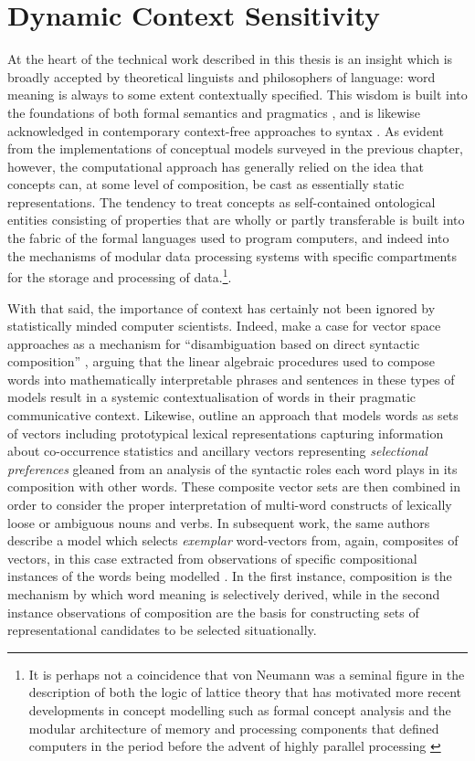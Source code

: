 \section{Dynamic Context Sensitivity} \label{sec:sensitivity}
At the heart of the technical work described in this thesis is an insight which is broadly accepted by theoretical linguists and philosophers of language: word meaning is always to some extent contextually specified.  This wisdom is built into the foundations of both formal semantics \citep{Montague1974} and pragmatics \citep{Grice1975}, and is likewise acknowledged in contemporary context-free approaches to syntax \citep{Chomsky1986}.  As evident from the implementations of conceptual models surveyed in the previous chapter, however, the computational approach has generally relied on the idea that concepts can, at some level of composition, be cast as essentially static representations.  The tendency to treat concepts as self-contained ontological entities consisting of properties that are wholly or partly transferable is built into the fabric of the formal languages used to program computers, and indeed into the mechanisms of modular data processing systems with specific compartments for the storage and processing of data.\footnote{It is perhaps not a coincidence that von Neumann was a seminal figure in the description of both the logic of lattice theory \citep{Birkhoff1958} that has motivated more recent developments in concept modelling such as formal concept analysis \citep{Wille1982} and the modular architecture of memory and processing components that defined computers in the period before the advent of highly parallel processing \citep{VonNeumann1945}}.

With that said, the importance of context has certainly not been ignored by statistically minded computer scientists.  Indeed, \citeauthor{BaroniEA2014b} make a case for vector space approaches as a mechanism for ``disambiguation based on direct syntactic composition'' \citep[][p. 254]{BaroniEA2014b}, arguing that the linear algebraic procedures used to compose words into mathematically interpretable phrases and sentences in these types of models result in a systemic contextualisation of words in their pragmatic communicative context.  Likewise, \cite{ErkEA2008} outline an approach that models words as sets of vectors including prototypical lexical representations capturing information about co-occurrence statistics and ancillary vectors representing \emph{selectional preferences} \citep[\emph{per}][]{Wilks1978} gleaned from an analysis of the syntactic roles each word plays in its composition with other words.  These composite vector sets are then combined in order to consider the proper interpretation of multi-word constructs of lexically loose or ambiguous nouns and verbs.  In subsequent work, the same authors describe a model which selects \emph{exemplar} word-vectors from, again, composites of vectors, in this case extracted from observations of specific compositional instances of the words being modelled \citep{ErkEA2010}.  In the first instance, composition is the mechanism by which word meaning is selectively derived, while in the second instance observations of composition are the basis for constructing sets of representational candidates to be selected situationally.

